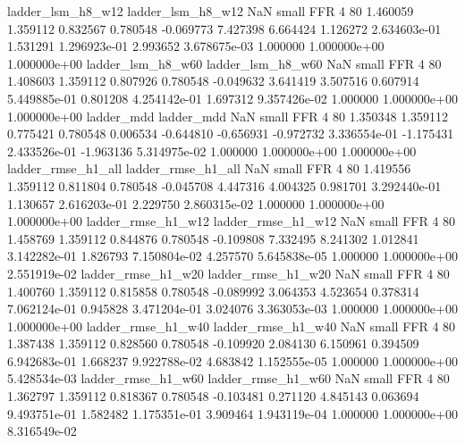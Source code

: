        ladder_lsm_h8_w12        ladder_lsm_h8_w12                   NaN      small      FFR                 4 80 1.460059       1.359112 0.832567       0.780548   -0.069773      7.427398      6.664424     1.126272   2.634603e-01  1.531291 1.296923e-01     2.993652   3.678675e-03            1.000000    1.000000e+00        1.000000e+00
       ladder_lsm_h8_w60        ladder_lsm_h8_w60                   NaN      small      FFR                 4 80 1.408603       1.359112 0.807926       0.780548   -0.049632      3.641419      3.507516     0.607914   5.449885e-01  0.801208 4.254142e-01     1.697312   9.357426e-02            1.000000    1.000000e+00        1.000000e+00
              ladder_mdd               ladder_mdd                   NaN      small      FFR                 4 80 1.350348       1.359112 0.775421       0.780548    0.006534     -0.644810     -0.656931    -0.972732   3.336554e-01 -1.175431 2.433526e-01    -1.963136   5.314975e-02            1.000000    1.000000e+00        1.000000e+00
      ladder_rmse_h1_all       ladder_rmse_h1_all                   NaN      small      FFR                 4 80 1.419556       1.359112 0.811804       0.780548   -0.045708      4.447316      4.004325     0.981701   3.292440e-01  1.130657 2.616203e-01     2.229750   2.860315e-02            1.000000    1.000000e+00        1.000000e+00
      ladder_rmse_h1_w12       ladder_rmse_h1_w12                   NaN      small      FFR                 4 80 1.458769       1.359112 0.844876       0.780548   -0.109808      7.332495      8.241302     1.012841   3.142282e-01  1.826793 7.150804e-02     4.257570   5.645838e-05            1.000000    1.000000e+00        2.551919e-02
      ladder_rmse_h1_w20       ladder_rmse_h1_w20                   NaN      small      FFR                 4 80 1.400760       1.359112 0.815858       0.780548   -0.089992      3.064353      4.523654     0.378314   7.062124e-01  0.945828 3.471204e-01     3.024076   3.363053e-03            1.000000    1.000000e+00        1.000000e+00
      ladder_rmse_h1_w40       ladder_rmse_h1_w40                   NaN      small      FFR                 4 80 1.387438       1.359112 0.828560       0.780548   -0.109920      2.084130      6.150961     0.394509   6.942683e-01  1.668237 9.922788e-02     4.683842   1.152555e-05            1.000000    1.000000e+00        5.428534e-03
      ladder_rmse_h1_w60       ladder_rmse_h1_w60                   NaN      small      FFR                 4 80 1.362797       1.359112 0.818367       0.780548   -0.103481      0.271120      4.845143     0.063694   9.493751e-01  1.582482 1.175351e-01     3.909464   1.943119e-04            1.000000    1.000000e+00        8.316549e-02
